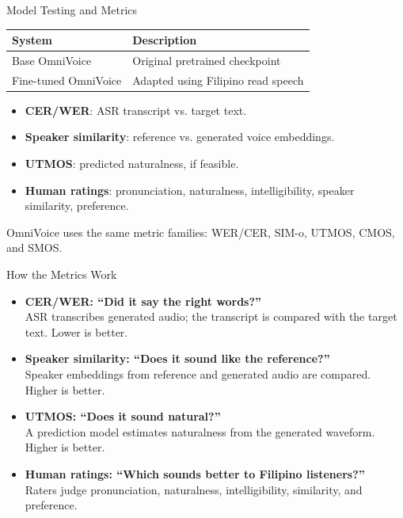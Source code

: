 \documentclass[aspectratio=169]{beamer}
\begin{document}
\begin{frame}{Model Testing and Metrics}
  \begin{table}
    \centering
    \small
    \begin{tabular}{p{}p{}}
      \toprule
      System & Description \\
      \midrule
      Base OmniVoice & Original pretrained checkpoint \\
      Fine-tuned OmniVoice & Adapted using Filipino read speech \\
      \bottomrule
    \end{tabular}
  \end{table}

  \vspace{0.4em}

  \begin{itemize}
    \item \textbf{CER/WER}: ASR transcript vs. target text.
    \item \textbf{Speaker similarity}: reference vs. generated voice embeddings.
    \item \textbf{UTMOS}: predicted naturalness, if feasible.
    \item \textbf{Human ratings}: pronunciation, naturalness, intelligibility, speaker similarity, preference.
  \end{itemize}

  \vspace{0.3em}
  \small OmniVoice uses the same metric families: WER/CER, SIM-o, UTMOS, CMOS, and SMOS.
\end{frame}

\begin{frame}{How the Metrics Work}
  \begin{itemize}
    \item \textbf{CER/WER: ``Did it say the right words?''}\\
    ASR transcribes generated audio; the transcript is compared with the target text. Lower is better.
    \item \textbf{Speaker similarity: ``Does it sound like the reference?''}\\
    Speaker embeddings from reference and generated audio are compared. Higher is better.
    \item \textbf{UTMOS: ``Does it sound natural?''}\\
    A prediction model estimates naturalness from the generated waveform. Higher is better.
    \item \textbf{Human ratings: ``Which sounds better to Filipino listeners?''}\\
    Raters judge pronunciation, naturalness, intelligibility, similarity, and preference.
  \end{itemize}
\end{frame}
\end{document}

